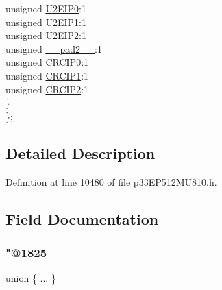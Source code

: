 \begin{DoxyCompactItemize}
\begin{tabbing}
\>\>unsigned \hyperlink{structtag_i_p_c16_b_i_t_s_a6e71b7f984be0aaa81438fdec9bc48d3}{U2EIP0}:1\\
\>\>unsigned \hyperlink{structtag_i_p_c16_b_i_t_s_a4c4a41b85744345a7a733ab259622c27}{U2EIP1}:1\\
\>\>unsigned \hyperlink{structtag_i_p_c16_b_i_t_s_ae1dd768b4d0561c4ff1024806c23c118}{U2EIP2}:1\\
\>\>unsigned \hyperlink{structtag_i_p_c16_b_i_t_s_a4d97cc5f7d51d22fc2bf3eab35c9cb7f}{\_\_pad2\_\_}:1\\
\>\>unsigned \hyperlink{structtag_i_p_c16_b_i_t_s_a3bcd2a24b3d13972bfa8f0dcbe81a9b6}{CRCIP0}:1\\
\>\>unsigned \hyperlink{structtag_i_p_c16_b_i_t_s_a27920f40e1b593423717ac1c62b63b90}{CRCIP1}:1\\
\>\>unsigned \hyperlink{structtag_i_p_c16_b_i_t_s_a6d01610bdfdb90e13f116cd67f741249}{CRCIP2}:1\\
\>\} \\
\}; \\

\end{tabbing}\end{DoxyCompactItemize}


\subsection{Detailed Description}


Definition at line 10480 of file p33\+E\+P512\+M\+U810.\+h.



\subsection{Field Documentation}
\mbox{\label{structtag_i_p_c16_b_i_t_s_a4b338c3a0f5995f739ccc3ee3a1311f0}} 
\subsubsection{\texorpdfstring{"@1825}{@1825}}
{\footnotesize\ttfamily union \{ ... \} }

\mbox{\label{structtag_i_p_c16_b_i_t_s_adf71f3d8410c1f1dbbc96680a92c49af}} 
